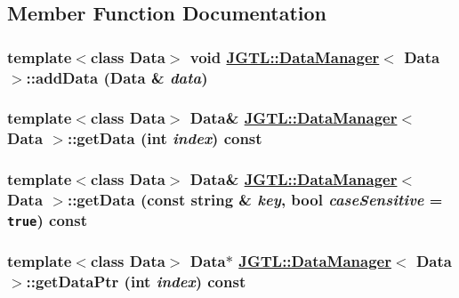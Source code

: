 \subsection{Member Function Documentation}
\hypertarget{class_j_g_t_l_1_1_data_manager_67daf4c2ff45ed86ee52295355fa7aa6}{
\subsubsection[addData]{\setlength{\rightskip}{0pt plus 5cm}template$<$class Data$>$ void \hyperlink{class_j_g_t_l_1_1_data_manager}{JGTL::Data\-Manager}$<$ Data $>$::add\-Data (Data \& {\em data})}}
\label{class_j_g_t_l_1_1_data_manager_67daf4c2ff45ed86ee52295355fa7aa6}


\hypertarget{class_j_g_t_l_1_1_data_manager_e74ffb480046ea8c78a6cd3bd90b0c49}{
\subsubsection[getData]{\setlength{\rightskip}{0pt plus 5cm}template$<$class Data$>$ Data\& \hyperlink{class_j_g_t_l_1_1_data_manager}{JGTL::Data\-Manager}$<$ Data $>$::get\-Data (int {\em index}) const}}
\label{class_j_g_t_l_1_1_data_manager_e74ffb480046ea8c78a6cd3bd90b0c49}


\hypertarget{class_j_g_t_l_1_1_data_manager_79748c8bd3a3ede098c3ebffe0357a98}{
\subsubsection[getData]{\setlength{\rightskip}{0pt plus 5cm}template$<$class Data$>$ Data\& \hyperlink{class_j_g_t_l_1_1_data_manager}{JGTL::Data\-Manager}$<$ Data $>$::get\-Data (const string \& {\em key}, bool {\em case\-Sensitive} = {\tt true}) const}}
\label{class_j_g_t_l_1_1_data_manager_79748c8bd3a3ede098c3ebffe0357a98}


\hypertarget{class_j_g_t_l_1_1_data_manager_f5abfb945d321d19c19ad94e3e4ca6f9}{
\subsubsection[getDataPtr]{\setlength{\rightskip}{0pt plus 5cm}template$<$class Data$>$ Data$\ast$ \hyperlink{class_j_g_t_l_1_1_data_manager}{JGTL::Data\-Manager}$<$ Data $>$::get\-Data\-Ptr (int {\em index}) const}}
\label{class_j_g_t_l_1_1_data_manager_f5abfb945d321d19c19ad94e3e4ca6f9}


